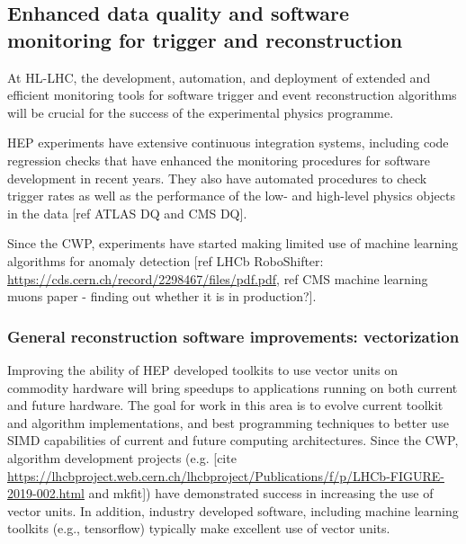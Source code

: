 \documentclass[10pt,a4paper]{article}
\begin{document}
\hypertarget{enhanced-data-quality-and-software-monitoring-for-trigger-and-reconstruction}{%
\subsection{Enhanced data quality and software monitoring for trigger
and
reconstruction}\label{enhanced-data-quality-and-software-monitoring-for-trigger-and-reconstruction}}

At HL-LHC, the development, automation, and deployment of extended and
efficient monitoring tools for software trigger and event reconstruction
algorithms will be crucial for the success of the experimental physics
programme.

HEP experiments have extensive continuous integration systems, including
code regression checks that have enhanced the monitoring procedures for
software development in recent years. They also have automated
procedures to check trigger rates as well as the performance of the low-
and high-level physics objects in the data {[}ref ATLAS DQ and CMS
DQ{]}.

Since the CWP, experiments have started making limited use of machine
learning algorithms for anomaly detection {[}ref LHCb RoboShifter:
\href{https://cds.cern.ch/record/2298467/files/pdf.pdf}{{https://cds.cern.ch/record/2298467/files/pdf.pdf}},
ref CMS machine learning muons paper - finding out whether it is in
production?{]}.

\hypertarget{general-reconstruction-software-improvements-vectorization}{%
\subsubsection{General reconstruction software improvements:
vectorization}\label{general-reconstruction-software-improvements-vectorization}}

Improving the ability of HEP developed toolkits to use vector units on
commodity hardware will bring speedups to applications running on both
current and future hardware. The goal for work in this area is to evolve
current toolkit and algorithm implementations, and best programming
techniques to better use SIMD capabilities of current and future
computing architectures. Since the CWP, algorithm development projects
(e.g. {[}cite
\url{https://lhcbproject.web.cern.ch/lhcbproject/Publications/f/p/LHCb-FIGURE-2019-002.html}
and mkfit{]}) have demonstrated success in increasing the use of vector
units. In addition, industry developed software, including machine
learning toolkits (e.g., tensorflow) typically make excellent use of
vector units.
\end{document}

